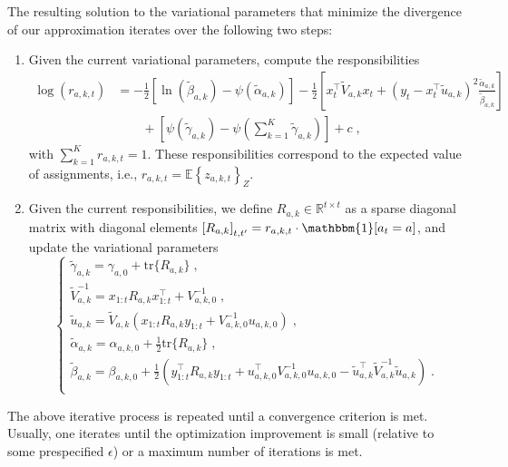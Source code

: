 \documentclass[10pt]{article}
\def \Real{{\mathbb R}}
\newcommand{\eValue}[1]{\mathbb{E}\left\{ #1 \right\}}
\newcommand{\ie}{i.e., }
\newcommand{\tr}{\mathrm{tr}}
\begin{document}
The resulting solution to the variational parameters that minimize the divergence of our approximation iterates over the following two steps:
\begin{enumerate}
	\item Given the current variational parameters, compute the responsibilities
		\begin{equation}
		\begin{split}
		\log (r_{a,k,t}) &= -\frac{1}{2} \left[\ln\left(\widetilde{\beta}_{a,k}\right) - \psi \left(\widetilde{\alpha}_{a,k}\right)\right] -\frac{1}{2} \left[x_t^\top \widetilde{V}_{a,k} x_t + (y_t-x_t^\top \widetilde{u}_{a,k})^2\frac{\widetilde{\alpha}_{a,k}}{\widetilde{\beta}_{a,k}}\right] \\
		& \qquad + \left[\psi(\widetilde{\gamma}_{a,k})- \psi\left(\sum_{k=1}^K\widetilde{\gamma}_{a,k}\right)\right] + c \;,
		\end{split}
		\end{equation}
		with $\sum_{k=1}^K r_{a,k,t} = 1$. These responsibilities correspond to the expected value of assignments, \ie $r_{a,k,t}=\eValue{z_{a,k,t}}_{Z}$.
	\item Given the current responsibilities, we define $R_{a,k}\in\Real^{t\times t}$ as a sparse diagonal matrix with diagonal elements $\left[R_{a,k}\right]_{t,t^\prime}=r_{a,k,t} \cdot \mathbbm{1}[a_t=a]$, and update the variational parameters
		\begin{equation}
		\begin{cases}
		\widetilde{\gamma}_{a,k}=\gamma_{a,0} + \tr\{R_{a,k}\} \;, \\
		\widetilde{V}_{a,k}^{-1} = x_{1:t} R_{a,k} x_{1:t}^\top + V_{a,k,0}^{-1} \;,\\
		\widetilde{u}_{a,k}= \widetilde{V}_{a,k} \left( x_{1:t} R_{a,k} y_{1:t} + V_{a,k,0}^{-1} u_{a,k,0}\right) \;, \\
		\widetilde{\alpha}_{a,k} = \alpha_{a,k,0} + \frac{1}{2} \tr\{R_{a,k}\} \;, \\
		\widetilde{\beta}_{a,k} = \beta_{a,k,0} + \frac{1}{2}\left(y_{1:t}^\top R_{a,k}y_{1:t} + u_{a,k,0}^\top V_{a,k,0}^{-1} u_{a,k,0} - \widetilde{u}_{a,k}^\top \widetilde{V}_{a,k}^{-1} \widetilde{u}_{a,k} \right) \; .\\
		\end{cases}
		\end{equation}
\end{enumerate}

The above iterative process is repeated until a convergence criterion is met. Usually, one iterates until the optimization improvement is small (relative to some prespecified $\epsilon$) or a maximum number of iterations is met.
\end{document}
